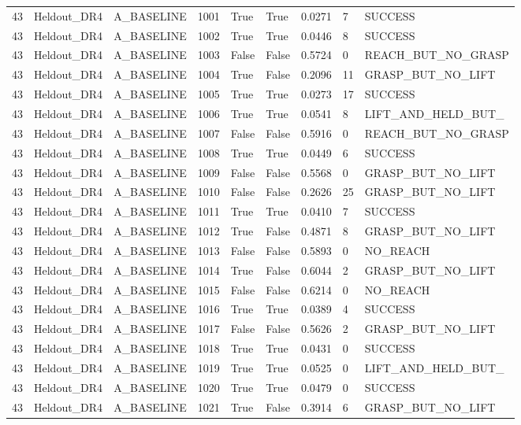 \documentclass[11pt,a4paper,oneside]{book}
\begin{document}
\begin{longtable}{l l l l l l l l l}
43 & Heldout\_DR4 & A\_BASELINE & 1001 & True & True & 0.0271 & 7 & SUCCESS \\
43 & Heldout\_DR4 & A\_BASELINE & 1002 & True & True & 0.0446 & 8 & SUCCESS \\
43 & Heldout\_DR4 & A\_BASELINE & 1003 & False & False & 0.5724 & 0 & REACH\_BUT\_NO\_GRASP \\
43 & Heldout\_DR4 & A\_BASELINE & 1004 & True & False & 0.2096 & 11 & GRASP\_BUT\_NO\_LIFT \\
43 & Heldout\_DR4 & A\_BASELINE & 1005 & True & True & 0.0273 & 17 & SUCCESS \\
43 & Heldout\_DR4 & A\_BASELINE & 1006 & True & True & 0.0541 & 8 & LIFT\_AND\_HELD\_BUT\_ \\
43 & Heldout\_DR4 & A\_BASELINE & 1007 & False & False & 0.5916 & 0 & REACH\_BUT\_NO\_GRASP \\
43 & Heldout\_DR4 & A\_BASELINE & 1008 & True & True & 0.0449 & 6 & SUCCESS \\
43 & Heldout\_DR4 & A\_BASELINE & 1009 & False & False & 0.5568 & 0 & GRASP\_BUT\_NO\_LIFT \\
43 & Heldout\_DR4 & A\_BASELINE & 1010 & False & False & 0.2626 & 25 & GRASP\_BUT\_NO\_LIFT \\
43 & Heldout\_DR4 & A\_BASELINE & 1011 & True & True & 0.0410 & 7 & SUCCESS \\
43 & Heldout\_DR4 & A\_BASELINE & 1012 & True & False & 0.4871 & 8 & GRASP\_BUT\_NO\_LIFT \\
43 & Heldout\_DR4 & A\_BASELINE & 1013 & False & False & 0.5893 & 0 & NO\_REACH \\
43 & Heldout\_DR4 & A\_BASELINE & 1014 & True & False & 0.6044 & 2 & GRASP\_BUT\_NO\_LIFT \\
43 & Heldout\_DR4 & A\_BASELINE & 1015 & False & False & 0.6214 & 0 & NO\_REACH \\
43 & Heldout\_DR4 & A\_BASELINE & 1016 & True & True & 0.0389 & 4 & SUCCESS \\
43 & Heldout\_DR4 & A\_BASELINE & 1017 & False & False & 0.5626 & 2 & GRASP\_BUT\_NO\_LIFT \\
43 & Heldout\_DR4 & A\_BASELINE & 1018 & True & True & 0.0431 & 0 & SUCCESS \\
43 & Heldout\_DR4 & A\_BASELINE & 1019 & True & True & 0.0525 & 0 & LIFT\_AND\_HELD\_BUT\_ \\
43 & Heldout\_DR4 & A\_BASELINE & 1020 & True & True & 0.0479 & 0 & SUCCESS \\
43 & Heldout\_DR4 & A\_BASELINE & 1021 & True & False & 0.3914 & 6 & GRASP\_BUT\_NO\_LIFT \\

\end{longtable}
\end{document}
